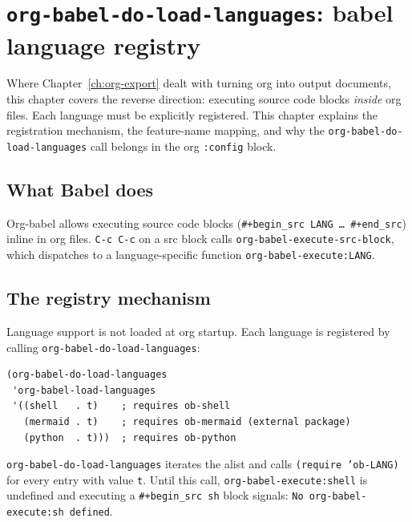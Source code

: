 \chapter{\texttt{org-babel-do-load-languages}: babel language registry}
\label{ch:org-babel}
\minitoc\label{org-babel-do-load-languages-babel-language-registry}

Where Chapter~\ref{ch:org-export} dealt with turning org into output
documents, this chapter covers the reverse direction: executing
source code blocks \emph{inside} org files.  Each language must be
explicitly registered.  This chapter explains the
registration mechanism, the feature-name mapping, and why the
\texttt{org-babel-do-load-languages} call belongs in the org
\texttt{:config} block.

\section{What Babel does}\label{what-babel-does}

Org-babel allows executing source code blocks (\texttt{\#+begin\_src LANG … \#+end\_src}) inline in org files. \texttt{C-c C-c} on a src block calls \texttt{org-babel-execute-src-block}, which dispatches to a language-specific function \texttt{org-babel-execute:LANG}.

\section{The registry mechanism}\label{the-registry-mechanism}

Language support is not loaded at org startup. Each language is registered by calling \texttt{org-babel-do-load-languages}:

\begin{verbatim}
(org-babel-do-load-languages
 'org-babel-load-languages
 '((shell   . t)    ; requires ob-shell
   (mermaid . t)    ; requires ob-mermaid (external package)
   (python  . t)))  ; requires ob-python
\end{verbatim}

\texttt{org-babel-do-load-languages} iterates the alist and calls \texttt{(require 'ob-LANG)} for every entry with value \texttt{t}. Until this call, \texttt{org-babel-execute:shell} is undefined and executing a \texttt{\#+begin\_src sh} block signals: \texttt{No org-babel-execute:sh defined}.

